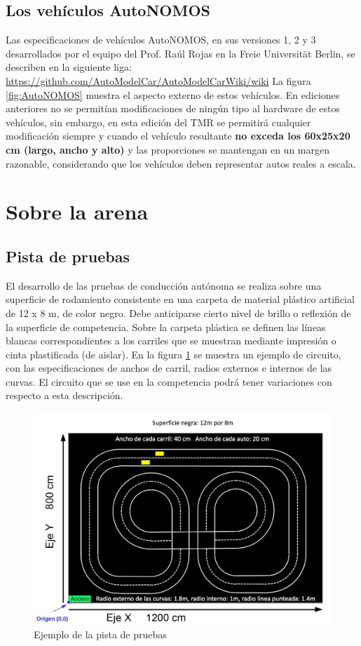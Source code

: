\documentclass[letterpaper,12pt]{article}
\begin{document}
\subsection{Los vehículos AutoNOMOS}

Las especificaciones de vehículos AutoNOMOS, en sus versiones 1, 2 y 3 desarrollados por el equipo del Prof. Raúl Rojas en la Freie Universität Berlin, se describen en la siguiente liga:
\url{https://github.com/AutoModelCar/AutoModelCarWiki/wiki}
La figura \ref{fig:AutoNOMOS} muestra el aspecto externo de estos vehículos. En ediciones anteriores no se permitían modificaciones de ningún tipo al hardware de estos vehículos, sin embargo, en esta edición del TMR se permitirá cualquier modificación siempre y cuando el vehículo resultante \textbf{no exceda los 60x25x20 cm (largo, ancho y alto)} y las proporciones se mantengan en un margen razonable, considerando que los vehículos deben representar autos reales a escala. 


\section{Sobre la arena}
\subsection{Pista de pruebas}
El desarrollo de las pruebas de conducción autónoma se realiza sobre una superficie de rodamiento consistente en una carpeta de material plástico artificial de 12 x 8 m, de color negro. Debe anticiparse cierto nivel de brillo o reflexión de la superficie de competencia. Sobre la carpeta plástica se definen las líneas blancas correspondientes a los carriles que se muestran mediante impresión o cinta plastificada (de aislar). En la figura \ref{fig:Arena} se muestra un ejemplo de circuito, con las especificaciones de anchos de carril, radios externos e internos de las curvas. El circuito que se use en la competencia podrá tener variaciones con respecto a esta descripción.

\begin{figure}[h!]
  \centering
  \includegraphics[width=\textwidth]{Figures/pista.png}
  \caption{Ejemplo de la pista de pruebas}
  \label{fig:Arena}
\end{figure}
\end{document}
